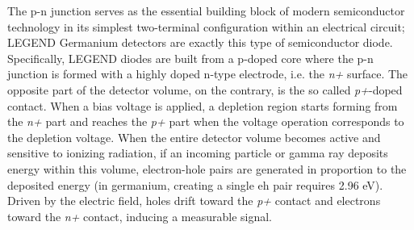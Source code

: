 The p-n junction serves as the essential building block of modern semiconductor technology in its simplest two-terminal configuration within an electrical circuit; LEGEND Germanium detectors are exactly this type of semiconductor diode. Specifically, LEGEND diodes are built from a p-doped core where the p-n junction is formed with a highly doped n-type electrode, i.e. the \textit{n+} surface. The opposite part of the detector volume, on the contrary, is the so called \textit{p+}-doped contact. When a bias voltage is applied, a depletion region starts forming from the \textit{n+} part and reaches the \textit{p+} part when the voltage operation corresponds to the depletion voltage. 
When the entire detector volume becomes active and sensitive to ionizing radiation, if an incoming particle or gamma ray deposits energy within this volume, electron-hole pairs are generated in proportion to the deposited energy (in germanium, creating a single \ac{eh} pair requires 2.96 eV). Driven by the electric field, holes drift toward the \textit{p+} contact and electrons toward the \textit{n+} contact, inducing a measurable signal.

